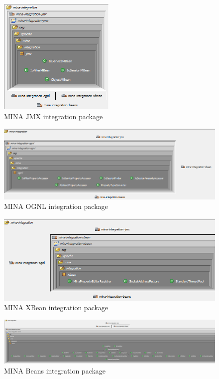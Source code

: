 \begin{figure}[H]
    \centering
    \includegraphics[width=0.5\textwidth]{images/MINA_integration_jmx.png}
    \caption{MINA JMX integration package}
    \label{fig:jmx_integration}
\end{figure}

\begin{figure}[H]
    \centering
    \includegraphics[width=\textwidth]{images/MINA_integration_ognl.png}
    \caption{MINA OGNL integration package}
    \label{fig:ognl_integration}
\end{figure}

\begin{figure}[H]
    \centering
    \includegraphics[width=\textwidth]{images/MINA_integration_xbean.png}
    \caption{MINA XBean integration package}
    \label{fig:xbean_integration}
\end{figure}

\begin{landscape}
\begin{figure}
    \centering
    \includegraphics[scale=0.5]{images/MINA_integration_beans.png}
    \caption{MINA Beans integration package}
    \label{fig:beans_integration}
\end{figure}
\end{landscape}

